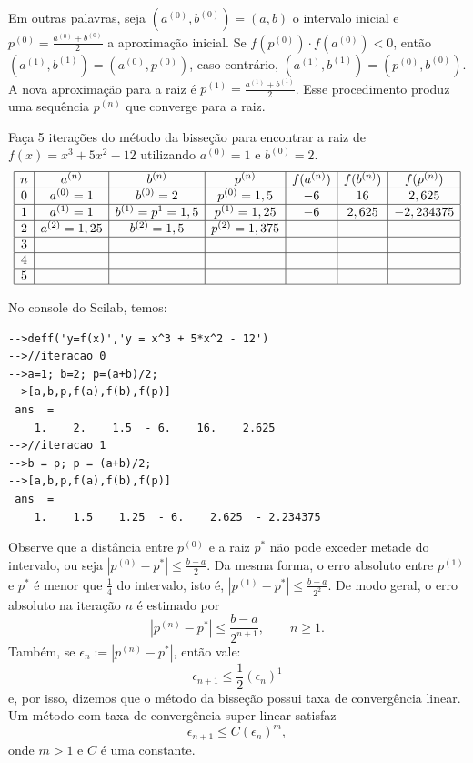 Em outras palavras, seja $(a^{(0)},b^{(0)})=(a,b)$ o intervalo inicial e $p^{(0)}=\frac{a^{(0)}+b^{(0)}}{2}$ a aproximação inicial. Se $f(p^{(0)})\cdot f(a^{(0)})<0$, então $(a^{(1)},b^{(1)})=(a^{(0)},p^{(0)})$, caso contrário, $(a^{(1)},b^{(1)})=(p^{(0)},b^{(0)})$. A nova aproximação para a raiz é $p^{(1)}=\frac{a^{(1)}+b^{(1)}}{2}$. Esse procedimento produz uma sequência $p^{(n)}$ que converge para a raiz.

\begin{ex}Faça 5 iterações do método da bisseção para encontrar a raiz de $f(x)=x^3+5x^2-12$ utilizando $a^{(0)}=1$ e $b^{(0)}=2$.
$$
\begin{array}{|c|c|c|c|c|c|c|}
\hline
n&a^{(n)}&b^{(n)}&p^{(n)}&f(a^{(n)})&f(b^{(n)})&f(p^{(n)})\\
\hline
0&a^{(0)}=1&b^{(0)}=2&p^{(0)}=1,5&-6 &16&2,625  \\
\hline
1&a^{(1)}=1&b^{(1)}=p^1=1,5&p^{(1)}=1,25&-6 &2,625&-2,234375  \\
\hline
2&a^{(2)}=1,25&b^{(2)}=1,5&p^{(2)}=1,375&&&\\
\hline
3&&&&&&\\
\hline
4&&&&&&\\
\hline
5&&&&&&\\
\hline
\end{array}
$$

\ifisscilab
No console do Scilab, temos:
\begin{verbatim}
-->deff('y=f(x)','y = x^3 + 5*x^2 - 12')
-->//iteracao 0
-->a=1; b=2; p=(a+b)/2;
-->[a,b,p,f(a),f(b),f(p)]
 ans  =
    1.    2.    1.5  - 6.    16.    2.625  
-->//iteracao 1
-->b = p; p = (a+b)/2;
-->[a,b,p,f(a),f(b),f(p)]
 ans  =
    1.    1.5    1.25  - 6.    2.625  - 2.234375
\end{verbatim}
\fi
\end{ex}

Observe que a distância entre $p^{(0)}$ e a raiz $p^*$ não pode exceder metade do intervalo, ou seja $|p^{(0)}-p^*|\leq \frac{b-a}{2}$. Da mesma forma, o erro absoluto entre $p^{(1)}$ e $p^*$ é menor que $\frac{1}{4}$ do intervalo, isto é, $|p^{(1)}-p^*|\leq \frac{b-a}{2^2}$. De modo geral, o erro absoluto na iteração $n$ é estimado por
$$
|p^{(n)}-p^*|\leq \frac{b-a}{2^{n+1}},\qquad n\geq 1.
$$
Também, se $\epsilon_n:=|p^{(n)}-p^*|$, então vale:
$$
\epsilon_{n+1}\leq \frac{1}{2}\left(\epsilon_n\right)^1
$$
e, por isso, dizemos que o método da bisseção possui taxa de convergência linear. Um método com taxa de convergência super-linear satisfaz
$$
\epsilon_{n+1}\leq C\left(\epsilon_n\right)^m,
$$
onde $m>1$ e $C$ é uma constante.

